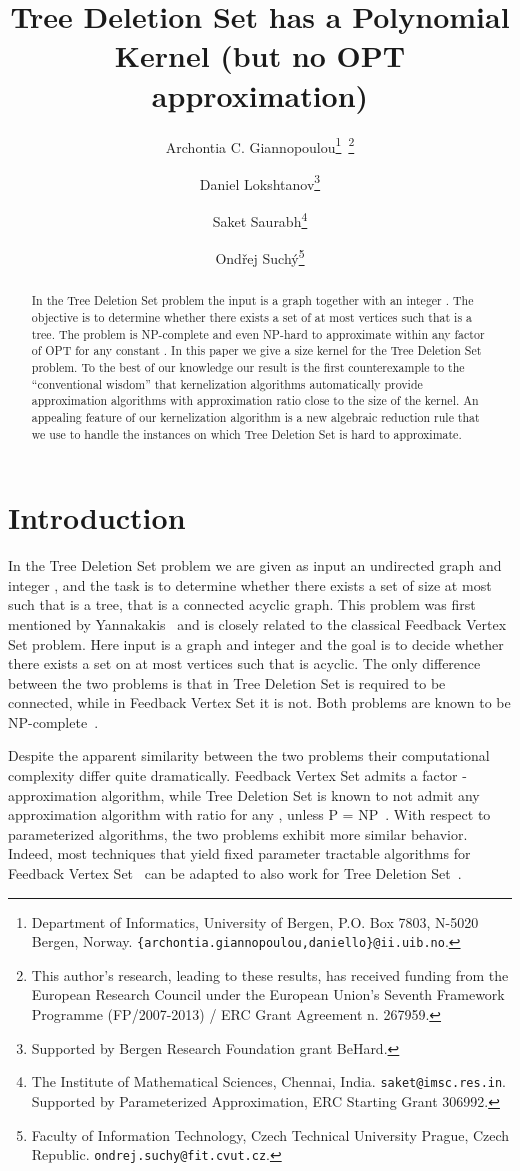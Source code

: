 \documentclass[a4paper,11pt]{article}
\title{\bf Tree Deletion Set has a Polynomial Kernel
\newline
(but no OPT approximation)
}
\author{Archontia C. Giannopoulou\thanks{Department of Informatics, University of Bergen, P.O. Box 7803, N-5020 Bergen, Norway.
\texttt{\{archontia.giannopoulou,daniello\}@ii.uib.no}.}~\thanks{This author's research, leading to these results, has received funding from the European Research Council under the European Union's Seventh Framework Programme (FP/2007-2013) / ERC Grant Agreement n. 267959.} 
\and Daniel Lokshtanov\thanks{Supported by Bergen Research Foundation grant BeHard.}
\and Saket Saurabh\thanks{The Institute of Mathematical Sciences, Chennai, India. \texttt{saket@imsc.res.in}. Supported by Parameterized Approximation, ERC Starting Grant 306992.}
\and Ond\v{r}ej Such\'{y}\thanks{Faculty of Information Technology, Czech Technical University Prague, Czech Republic. \texttt{ondrej.suchy@fit.cvut.cz}.}
}
\date{}
\begin{document}
\maketitle

\begin{abstract}
In the {\sc Tree Deletion Set} problem the input is a graph  together with an integer . The objective is to determine whether there exists a set  of at most  vertices such that  is a tree. The problem is {\sf NP}-complete and even {\sf NP}-hard to approximate within any factor of OPT for any constant . In this paper we give a  size kernel for the {\sc Tree Deletion Set} problem. To the best of our knowledge our result is the first counterexample to the ``conventional wisdom'' that kernelization algorithms automatically provide approximation algorithms with approximation ratio close to the size of the kernel.
An appealing feature of our kernelization algorithm is a new algebraic reduction rule that we use to handle the instances on which {\sc Tree Deletion Set} is hard to approximate.
\end{abstract}

\section{Introduction} \label{sec_intro}
In the {\sc Tree Deletion Set} problem we are given as input an undirected graph  and integer , and the task is to determine whether there exists a set  of size at most  such that  is a tree, that is a connected acyclic graph. This problem was first mentioned by Yannakakis~\cite{Yannakakis79} and is closely related to the classical {\sc Feedback Vertex Set} problem. Here input is a graph  and integer  and the goal is to decide whether there exists a set  on at most  vertices such that  is acyclic. The only difference between the two problems is that in {\sc Tree Deletion Set}  is required to be connected, while in {\sc Feedback Vertex Set} it is not. Both problems are known to be {\sf NP}-complete~\cite{GJ79,Yannakakis79}.

Despite the apparent similarity between the two problems their computational complexity differ quite dramatically. {\sc Feedback Vertex Set} admits a factor -approximation algorithm, while {\sc Tree Deletion Set} is known to not admit any approximation algorithm with ratio  for any , unless {\sf P} = {\sf NP}~\cite{BafnaBF99,Yannakakis79}. With respect to parameterized algorithms, the two problems exhibit more similar behavior. Indeed, most techniques that yield fixed parameter tractable algorithms for {\sc Feedback Vertex Set}~\cite{ChenFLLV08,CaoCL10} can be adapted to also work for {\sc Tree Deletion Set}~\cite{RamanSS13}. 
\end{document}
